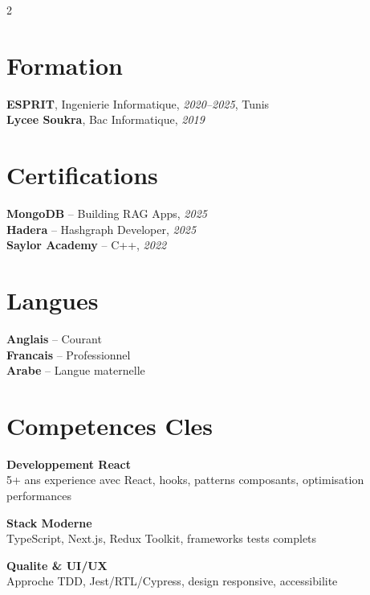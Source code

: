 \documentclass[10pt,a4paper]{article}
\begin{document}
\vspace{6pt}
\begin{multicols}{2}

\section*{Formation}
{\small
\textbf{ESPRIT}, Ingenierie Informatique, \textit{2020--2025}, Tunis\\[1pt]
\textbf{Lycee Soukra}, Bac Informatique, \textit{2019}
}

\vspace{3pt}
\section*{Certifications}
{\small
\textbf{MongoDB} -- Building RAG Apps, \textit{2025}\\[1pt]
\textbf{Hadera} -- Hashgraph Developer, \textit{2025}\\[1pt]
\textbf{Saylor Academy} -- C++, \textit{2022}
}

\columnbreak

\section*{Langues}
{\small
\textbf{Anglais} -- Courant\\[1pt]
\textbf{Francais} -- Professionnel\\[1pt]
\textbf{Arabe} -- Langue maternelle
}

\vspace{3pt}
\section*{Competences Cles}
{\small
\textbf{Developpement React}\\[1pt]
5+ ans experience avec React, hooks, patterns composants, optimisation performances

\vspace{4pt}
\textbf{Stack Moderne}\\[1pt]
TypeScript, Next.js, Redux Toolkit, frameworks tests complets

\vspace{4pt}
\textbf{Qualite \& UI/UX}\\[1pt]
Approche TDD, Jest/RTL/Cypress, design responsive, accessibilite
}

\end{multicols}
\end{document}
